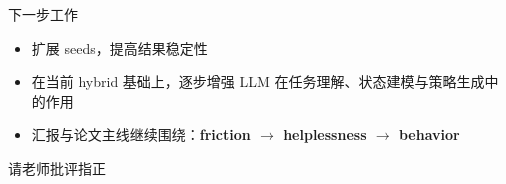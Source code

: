 \documentclass[aspectratio=169]{beamer}
\begin{document}
\begin{frame}{下一步工作}
    \begin{itemize}
        \item 扩展 seeds，提高结果稳定性
        \item 在当前 hybrid 基础上，逐步增强 LLM 在任务理解、状态建模与策略生成中的作用
        \item 汇报与论文主线继续围绕：\textbf{friction $\rightarrow$ helplessness $\rightarrow$ behavior}
    \end{itemize}
\end{frame}

\begin{frame}
    \centering
    \Huge{请老师批评指正}
\end{frame}
\end{document}
